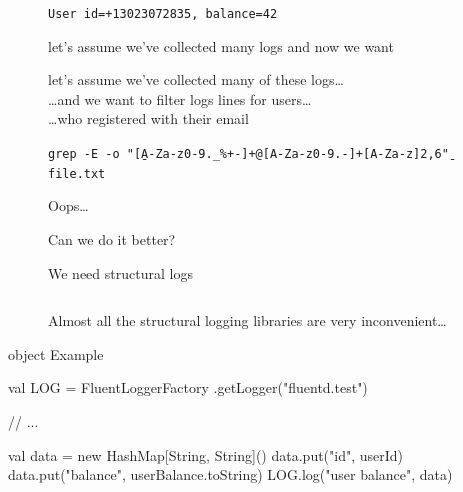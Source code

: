 \documentclass[usenames,dvipsnames,aspectratio=169]{beamer}
\begin{document}
\begin{frame}
  \begin{figure}
  \huge
  \texttt{User id=+13023072835, balance=42}
  \end{figure}

  \begin{figure}
  \huge let's assume we've collected many logs and now we want 
  \end{figure}
\end{frame}

\begin{frame}
  \begin{figure}
  \huge let's assume we've collected many of these logs\dots \\
  \dots and we want to filter logs lines for users\dots \\
  \dots who registered with their email
  \end{figure}
\end{frame}

\begin{frame}
  \begin{figure}
  \large
  \texttt{grep -E -o "\b[A-Za-z0-9.\_\%+-]+@[A-Za-z0-9.-]+\.[A-Za-z]{2,6}\b" file.txt}
  \end{figure}

  \begin{figure}
  \Huge Oops\dots 
  \end{figure}
\end{frame}

\begin{frame}
  \begin{figure}
  \Huge Can we do it better?
  \end{figure}
\end{frame}

\begin{frame}[fragile]
  \begin{figure}
  \Huge We need structural logs
  \end{figure}


\begin{figure}
    \Large
    \inputminted{json}{ex-json-out.tmp}
\end{figure}
\end{frame}

\begin{frame}[fragile]
\begin{figure}
Almost all the structural logging libraries are very inconvenient\dots
\end{figure}
\begin{scalacode}
object Example {
  val LOG = FluentLoggerFactory
    .getLogger("fluentd.test")

  // ...

  val data =
      new HashMap[String, String]()
  data.put("id", userId)
  data.put("balance", userBalance.toString)
  LOG.log("user balance", data)
}
\end{scalacode}
\end{frame}
\end{document}
